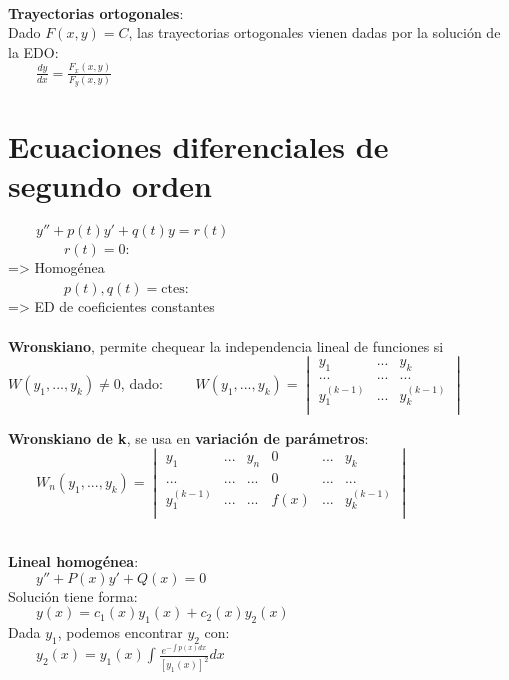 \documentclass[a4paper,landscape,10pt]{cheatsheet}
\begin{document}
\hfill\\
\textbf{Trayectorias ortogonales}:\\
Dado $F(x,y)=C$, las trayectorias ortogonales vienen dadas por la solución de la EDO:\\
$\qquad \frac{dy}{dx}=\frac{F_x(x,y)}{F_y(x,y)}$\\

\section{Ecuaciones diferenciales de segundo orden}
$\qquad y''+p(t)y'+q(t)y=r(t)$\\
$\qquad\qquad r(t)=0$:\\
\qquad\qquad\quad => Homogénea\\
$\qquad\qquad p(t),q(t) = \text{ctes}$:\\
\qquad\qquad\quad => ED de coeficientes constantes\\

\hfill\\
\textbf{Wronskiano}, permite chequear la independencia lineal de funciones si $W(y_1,...,y_k)\neq 0$, dado:
$\qquad W(y_1,...,y_k)=
  \begin{vmatrix*}
    y_1 & ... & y_k\\
    ... & ... & ...\\
    y^{(k-1)}_1 & ... & y^{(k-1)}_k \\
  \end{vmatrix*}
$

\textbf{Wronskiano de k}, se usa en \textbf{variación de parámetros}:\\
$\qquad W_n(y_1,...,y_k)=
  \begin{vmatrix*}
    y_1 & ... & y_{n} &  0 & ... & y_k\\
    ... & ... & ... & 0 & ... & ...\\
    y^{(k-1)}_1 & ... & ... & f(x) & ... & y^{(k-1)}_k \\
  \end{vmatrix*}
$

\hfill\\
\textbf{Lineal homogénea}:\\
$\qquad y''+P(x)y'+Q(x)=0$\\
Solución tiene forma:\\
$\qquad y(x)=c_1(x)y_1(x)+c_2(x)y_2(x)$\\
Dada $y_1$, podemos encontrar $y_2$ con:\\
$\qquad y_2(x)=y_1(x)\int\frac{e^{-\int p(x)dx}}{[y_1(x)]^2}dx$
\end{document}
